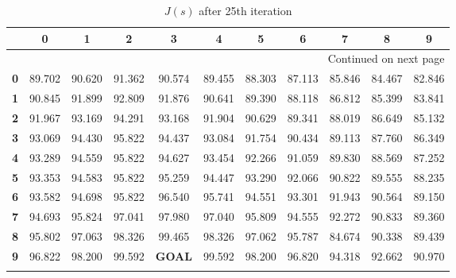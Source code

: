 \documentclass{article}
\begin{document}
\begin{longtable}{|c|c|c|c|c|c|c|c|c|c|c|}
\toprule
{} &       0 &       1 &       2 &       3 &       4 &       5 &       6 &       7 &       8 &       9 \\
\midrule
\endhead
\midrule
\multicolumn{11}{r}{{Continued on next page}} \\
\midrule
\endfoot

\bottomrule
\endlastfoot
\textbf{0} &  89.702 &  90.620 &  91.362 &  90.574 &  89.455 &  88.303 &  87.113 &  85.846 &  84.467 &  82.846 \\\hline
\textbf{1} &  90.845 &  91.899 &  92.809 &  91.876 &  90.641 &  89.390 &  88.118 &  86.812 &  85.399 &  83.841 \\\hline
\textbf{2} &  91.967 &  93.169 &  94.291 &  93.168 &  91.904 &  90.629 &  89.341 &  88.019 &  86.649 &  85.132 \\\hline
\textbf{3} &  93.069 &  94.430 &  95.822 &  94.437 &  93.084 &  91.754 &  90.434 &  89.113 &  87.760 &  86.349 \\\hline
\textbf{4} &  93.289 &  94.559 &  95.822 &  94.627 &  93.454 &  92.266 &  91.059 &  89.830 &  88.569 &  87.252 \\\hline
\textbf{5} &  93.353 &  94.583 &  95.822 &  95.259 &  94.447 &  93.290 &  92.066 &  90.822 &  89.555 &  88.235 \\\hline
\textbf{6} &  93.582 &  94.698 &  95.822 &  96.540 &  95.741 &  94.551 &  93.301 &  91.943 &  90.564 &  89.150 \\\hline
\textbf{7} &  94.693 &  95.824 &  97.041 &  97.980 &  97.040 &  95.809 &  94.555 &  92.272 &  90.833 &  89.360 \\\hline
\textbf{8} &  95.802 &  97.063 &  98.326 &  99.465 &  98.326 &  97.062 &  95.787 &  84.674 &  90.338 &  89.439 \\\hline
\textbf{9} &  96.822 &  98.200 &  99.592 &   \textbf{GOAL} &  99.592 &  98.200 &  96.820 &  94.318 &  92.662 &  90.970 \\\hline
\caption{$J(s)$ after 25th iteration}
\end{longtable}
\end{document}
